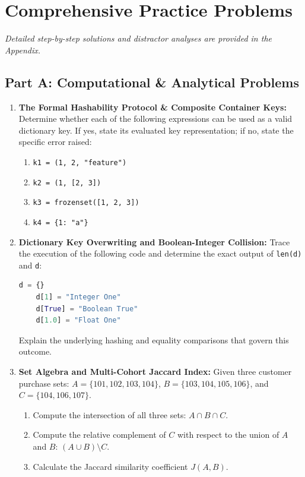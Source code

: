 \newpage
\section{Comprehensive Practice Problems}
\textit{Detailed step-by-step solutions and distractor analyses are provided in the Appendix.}

\subsection*{Part A: Computational \& Analytical Problems}

\begin{enumerate}
    \item \textbf{The Formal Hashability Protocol \& Composite Container Keys:}
    Determine whether each of the following expressions can be used as a valid dictionary key. If yes, state its evaluated key representation; if no, state the specific error raised:
    \begin{enumerate}
        \item \texttt{k1 = (1, 2, "feature")}
        \item \texttt{k2 = (1, [2, 3])}
        \item \texttt{k3 = frozenset([1, 2, 3])}
        \item \texttt{k4 = \{1: "a"\}}
    \end{enumerate}

    \item \textbf{Dictionary Key Overwriting and Boolean-Integer Collision:}
    Trace the execution of the following code and determine the exact output of \texttt{len(d)} and \texttt{d}:
    \begin{lstlisting}[language=Python]
    d = {}
    d[1] = "Integer One"
    d[True] = "Boolean True"
    d[1.0] = "Float One"
    \end{lstlisting}
    Explain the underlying hashing and equality comparisons that govern this outcome.

    \item \textbf{Set Algebra and Multi-Cohort Jaccard Index:}
    Given three customer purchase sets:
    $A = \{101, 102, 103, 104\}$, $B = \{103, 104, 105, 106\}$, and $C = \{104, 106, 107\}$.
    \begin{enumerate}
        \item Compute the intersection of all three sets: $A \cap B \cap C$.
        \item Compute the relative complement of $C$ with respect to the union of $A$ and $B$: $(A \cup B) \setminus C$.
        \item Calculate the Jaccard similarity coefficient $J(A, B)$.
    \end{enumerate}


\end{enumerate}

